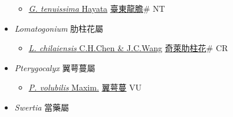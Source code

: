 \begin{itemize}
\begin{itemize}
        \item[] \href{http://www.theplantlist.org/tpl1.1/search?q=Gentiana+tenuissima}{\textit{G. tenuissima} Hayata}   \href{\detokenize{http://taibnet.sinica.edu.tw/chi/taibnet_species_list.php?T2=臺東龍膽&T2_new_value=true&fr=y}}{臺東龍膽}\# NT
  \end{itemize}
 \item[] \textit{Lomatogonium} 肋柱花屬
                    
  \begin{itemize}
        \item[] \href{http://www.theplantlist.org/tpl1.1/search?q=Lomatogonium+chilaiensis}{\textit{L. chilaiensis} C.H.Chen \& J.C.Wang}   \href{\detokenize{http://taibnet.sinica.edu.tw/chi/taibnet_species_list.php?T2=奇萊肋柱花&T2_new_value=true&fr=y}}{奇萊肋柱花}\# CR
  \end{itemize}
 \item[] \textit{Pterygocalyx} 翼萼蔓屬
                    
  \begin{itemize}
        \item[] \href{http://www.theplantlist.org/tpl1.1/search?q=Pterygocalyx+volubilis}{\textit{P. volubilis} Maxim.}   \href{\detokenize{http://taibnet.sinica.edu.tw/chi/taibnet_species_list.php?T2=翼萼蔓&T2_new_value=true&fr=y}}{翼萼蔓} VU
  \end{itemize}
 \item[] \textit{Swertia} 當藥屬
                    

\end{itemize}
